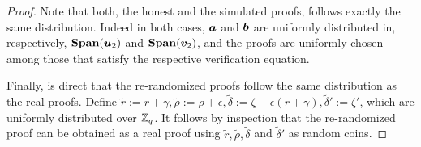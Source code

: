 \begin{proof}
Note that both, the honest and the simulated proofs, follows exactly the same distribution. Indeed in both cases, ${\boldsymbol{a}}$ and ${\boldsymbol{b}}$ are uniformly distributed in, respectively, $\mathbf{Span}({\boldsymbol{u}}_2)$ and $\mathbf{Span}({\boldsymbol{v}}_2)$, and the proofs are uniformly chosen among those that satisfy the respective verification equation.

Finally, is direct that the re-randomized proofs follow the same distribution as the real proofs. Define $\tilde{r} := r + \gamma,\tilde{\rho} := \rho+\epsilon,\tilde{\delta} := \zeta-\epsilon(r+\gamma), \tilde{\delta}' := \zeta'$, which are uniformly distributed over $\mathbb{Z}_q$. It follows by inspection that the re-randomized proof can be obtained as a real proof using $\tilde{r},\tilde{\rho},\tilde{\delta}$ and $\tilde{\delta}'$ as random coins.
\end{proof} 

